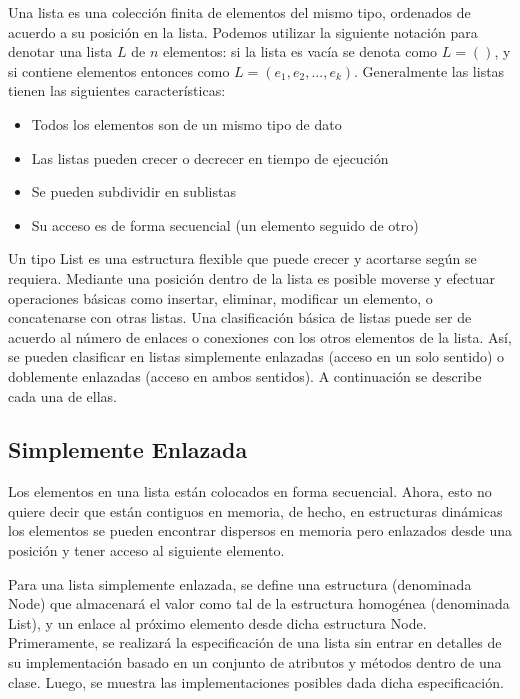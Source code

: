 Una lista es una colección finita de elementos del mismo tipo, ordenados de acuerdo a su posición en la lista. Podemos utilizar la siguiente notación para denotar una lista $L$ de $n$ elementos: si la lista es vacía se denota como $L=()$, y si contiene elementos entonces como $L=(e_1, e_2, ..., e_k)$. Generalmente las listas tienen las siguientes características:
\begin{itemize}
\item Todos los elementos son de un mismo tipo de dato
\item Las listas pueden crecer o decrecer en tiempo de ejecución
\item Se pueden subdividir en sublistas
\item Su acceso es de forma secuencial (un elemento seguido de otro)
\end{itemize}

Un tipo List es una estructura flexible que puede crecer y acortarse según se requiera. Mediante una posición dentro de la lista es posible moverse y efectuar operaciones básicas como insertar, eliminar, modificar un elemento, o concatenarse con otras listas. Una clasificación básica de listas puede ser de acuerdo al número de enlaces o conexiones con los otros elementos de la lista. Así, se pueden clasificar en listas simplemente enlazadas (acceso en un solo sentido) o doblemente enlazadas (acceso en ambos sentidos). A continuación se describe cada una de ellas.

\subsection{Simplemente Enlazada}

Los elementos en una lista están colocados en forma secuencial. Ahora, esto no quiere decir que están contiguos en memoria, de hecho, en estructuras dinámicas los elementos se pueden encontrar dispersos en memoria pero enlazados desde una posición y tener acceso al siguiente elemento.

Para una lista simplemente enlazada, se define una estructura (denominada Node) que almacenará el valor como tal de la estructura homogénea (denominada List), y un enlace al próximo elemento desde dicha estructura Node. Primeramente, se realizará la especificación de una lista sin entrar en detalles de su implementación basado en un conjunto de atributos y métodos dentro de una clase. Luego, se muestra las implementaciones posibles dada dicha especificación.

